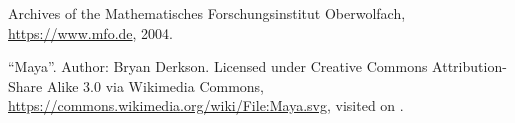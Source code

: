 \documentclass{snapshotmfo}
\begin{document}
\begin{imagecredits}
  \item[\Cref{fig.sample-image}] Archives of the Mathematisches Forschungsinstitut Oberwolfach,\\\url{https://www.mfo.de}, 2004.
  \item[\Cref{fig.maya}] ``Maya''. Author: Bryan Derkson. Licensed under Creative Commons Attribution-Share Alike 3.0 via Wikimedia Commons, \url{https://commons.wikimedia.org/wiki/File:Maya.svg}, visited on .
\end{imagecredits}


\end{document}

